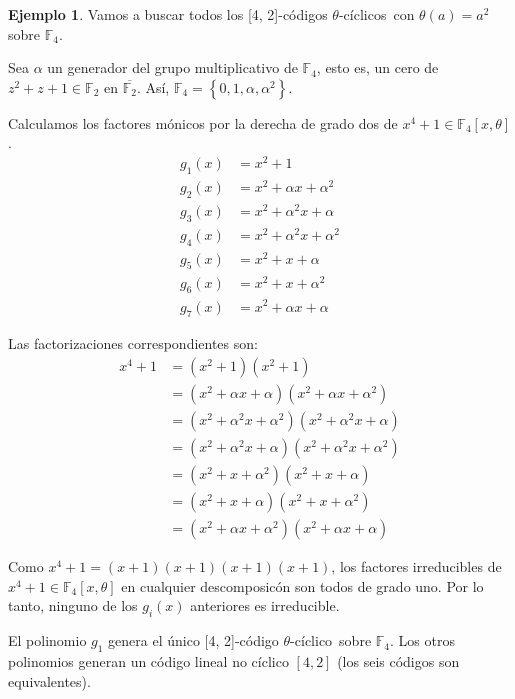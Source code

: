 \documentclass[a4paper,11pt]{article}
\numberwithin{equation}{section}
\theoremstyle{definition} %
\newtheorem{ejemplo}{Ejemplo}[section]
\newcommand{\tc}{$\theta$-cíclico\ }
\newcommand{\tcs}{$\theta$-cíclicos\ }
\begin{document}
    \begin{ejemplo}
        Vamos a buscar todos los [4, 2]-códigos \tcs con $\theta(a) = a^2$ sobre $\mathbb{F}_4$.

        Sea $\alpha$ un generador del grupo multiplicativo de $\mathbb{F}_4$, esto es, un cero de $z^2 + z + 1 \in \mathbb{F}_2$ en $\overline{\mathbb{F}_2}$. Así, $\mathbb{F}_4 = \left\{0, 1, \alpha, \alpha^2 \right\}$.

        Calculamos los factores mónicos por la derecha de grado dos de $x^4 + 1 \in \mathbb{F}_4[x, \theta]$.
        \begin{align*}
            g_1(x) &= x^2 + 1 \\
            g_2(x) &= x^2 + \alpha x + \alpha ^2 \\
            g_3(x) &=  x^2 + \alpha^2 x + \alpha \\
            g_4(x) &=  x^2 + \alpha^2 x + \alpha^2 \\
            g_5(x) &=  x^2 + x + \alpha \\
            g_6(x) &=  x^2 + x + \alpha^2 \\
            g_7(x) &= x^2 + \alpha x + \alpha
        \end{align*}

        Las factorizaciones correspondientes son:
        \begin{align*}
            x^4 + 1 &= (x^2 + 1)(x^2 + 1) \\
                    &= (x^2 + \alpha x + \alpha)(x^2 + \alpha x + \alpha ^2)\\
                    &= (x^2 + \alpha^2 x + \alpha^2)(x^2 + \alpha^2 x + \alpha)\\
                    &= (x^2 + \alpha^2 x + \alpha)(x^2 + \alpha^2 x + \alpha^2)\\
                    &= (x^2 + x + \alpha^2)(x^2 + x + \alpha)\\
                    &= (x^2 + x + \alpha)(x^2 + x + \alpha^2)\\
                    &= (x^2 + \alpha x + \alpha ^2)(x^2 + \alpha x + \alpha)
        \end{align*}

        Como  $x^4 + 1 = (x + 1)(x + 1)(x + 1)(x + 1)$, los factores irreducibles de $x^4 + 1 \in \mathbb{F}_4[x, \theta]$ en cualquier descomposicón son todos de grado uno. Por lo tanto, ninguno de los $g_i(x)$ anteriores es irreducible.

        El polinomio $g_1$ genera el único [4, 2]-código \tc sobre $\mathbb{F}_4$. Los otros polinomios generan un código lineal no cíclico $[4, 2]$ (los seis códigos son equivalentes).
    \end{ejemplo}
\end{document}
